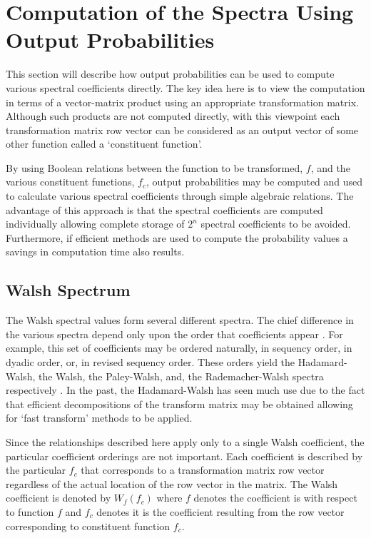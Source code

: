 \section{Computation of the Spectra Using Output Probabilities}
This section will describe how output probabilities can be used to compute
various spectral coefficients directly.  The key idea here is to view
the computation in terms of a vector-matrix product using an appropriate
transformation matrix.  Although such products are not computed directly,
with this viewpoint each transformation matrix row vector can be considered
as an output vector of some other function called a `constituent function'.

By using Boolean relations between the function to be transformed, $f$, and
the various constituent functions, $f_c$, output probabilities may be computed and
used to calculate various spectral coefficients through simple algebraic relations.  
The advantage of this approach is that
the spectral coefficients are computed individually allowing complete storage of
$2^n$ spectral coefficients to be avoided.  Furthermore, if efficient methods are
used to compute the probability values a savings in computation time also
results.

\subsection{Walsh Spectrum}
The Walsh spectral values form several different spectra.  The chief difference
in the various spectra depend only upon the order that coefficients appear
\cite{HMM85}.  For example, this set of coefficients may be ordered naturally,
in sequency order, in dyadic order, or, in revised sequency order.  
These orders yield the Hadamard-Walsh,
the Walsh, the Paley-Walsh, and, the Rademacher-Walsh spectra respectively \cite{PB85} \cite{HMM85}.
In the past, the Hadamard-Walsh has seen much use due to the fact that efficient
decompositions of the transform matrix may be obtained allowing for `fast
transform' methods \cite{CT65} \cite{JS69} to be applied.

Since the relationships described here apply only to a single Walsh coefficient,
the particular coefficient orderings are not important.  Each coefficient
is described by the particular $f_c$ that corresponds to a transformation
matrix row vector regardless of the actual location of the row vector in the matrix.
The Walsh coefficient is denoted by $W_f(f_c)$ where $f$ denotes the coefficient
is with respect to function $f$ and $f_c$ denotes it is the coefficient resulting
from the row vector corresponding to constituent function $f_c$.

